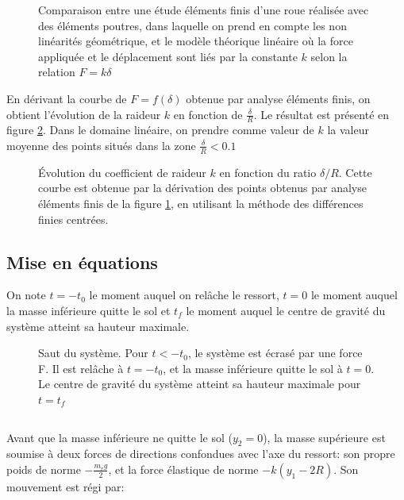 \begin{figure}[h]
\centering

\caption{Comparaison entre une étude éléments finis d'une roue réalisée avec des éléments poutres, dans laquelle on prend en compte les non linéarités géométrique, et le modèle théorique linéaire où la force appliquée et le déplacement sont liés par la constante $k$ selon la relation $F=k \delta$}
\label{fig:lin1}
\end{figure}

En dérivant la courbe de $F=f(\delta)$ obtenue par analyse éléments finis, on obtient l'évolution de la raideur $k$ en fonction de $\frac{\delta}{R}$. Le résultat est présenté en figure \ref{fig:lin2}. Dans le domaine linéaire, on prendre comme valeur de $k$ la valeur moyenne des points situés dans la zone $\frac{\delta}{R}<0.1$

\begin{figure}[h]
\centering

\caption{Évolution du coefficient de raideur $k$ en fonction du ratio $\delta/R$. Cette courbe est obtenue par la dérivation des points obtenus par analyse éléments finis de la figure \ref{fig:lin1}, en utilisant la méthode des différences finies centrées.}
\label{fig:lin2}
\end{figure}

\subsection{Mise en équations}

On note $t=-t_0$ le moment auquel on relâche le ressort, $t=0$ le moment auquel la masse inférieure quitte le sol et $t_f$ le moment auquel le centre de gravité du système atteint sa hauteur maximale.
\\

\begin{figure}[h]

\def\svgwidth{400}


\caption{Saut du système. Pour $t<-t_0$, le système est écrasé par une force F. Il est relâche à $t=-t_0$, et la masse inférieure quitte le sol à $t=0$. Le centre de gravité du système atteint sa hauteur maximale pour $t=t_f$}
\label{fig:saut}
\end{figure}

$$
$$
$$
$$


Avant que la masse inférieure ne quitte le sol ($y_2=0$), la masse supérieure est soumise à deux forces de directions confondues avec l'axe du ressort: son propre poids de norme $-\frac{m_r g}{2}$, et la force élastique de norme $-k(y_1-2R)$. Son mouvement est régi par:

